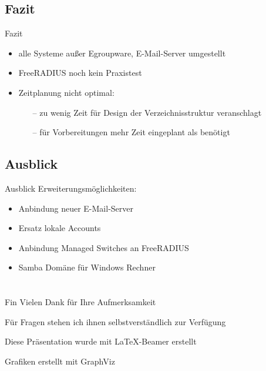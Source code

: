 \documentclass[presentation,svgnames,12pt]{beamer}
\begin{document}
\subsection{Fazit}
\begin{frame}{Fazit}
\begin{itemize}
	\item alle Systeme außer Egroupware, E-Mail-Server umgestellt
	\item FreeRADIUS noch kein Praxistest
	\item Zeitplanung nicht optimal:
	\vspace{6pt}
	\begin{itemize}
		\item[--] zu wenig Zeit für Design der Verzeichnisstruktur veranschlagt
		\item[--] für Vorbereitungen mehr Zeit eingeplant als benötigt
	\end{itemize}
\end{itemize}
\end{frame}


\subsection{Ausblick}
\begin{frame}{Ausblick}
Erweiterungsmöglichkeiten:
\vspace{6pt}
	\begin{itemize}
		\item Anbindung neuer E-Mail-Server
		\item Ersatz lokale Accounts
		\item Anbindung Managed Switches an FreeRADIUS
		\item Samba Domäne für Windows Rechner
	\end{itemize}
\end{frame}


\section{} %
\begin{frame}{Fin}
	\bigskip\bigskip\bigskip\bigskip\bigskip\bigskip
	Vielen Dank für Ihre Aufmerksamkeit
	
	Für Fragen stehen ich ihnen selbstverständlich zur Verfügung
	
	\bigskip\bigskip\bigskip
	\bigskip
	\bigskip
	\bigskip Diese Präsentation wurde mit \LaTeX{}-Beamer erstellt
	
	Grafiken erstellt mit GraphViz
\end{frame}
\end{document}
